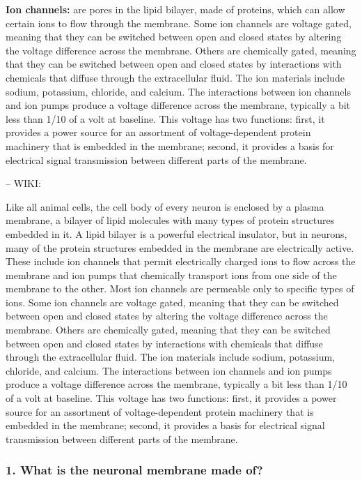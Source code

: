 \textbf{Ion channels:} are pores in the lipid bilayer, made of proteins, which can allow certain ions to flow through the membrane. Some ion channels are voltage gated, meaning that they can be switched between open and closed states by altering the voltage difference across the membrane. Others are chemically gated, meaning that they can be switched between open and closed states by interactions with chemicals that diffuse through the extracellular fluid. The ion materials include sodium, potassium, chloride, and calcium. The interactions between ion channels and ion pumps produce a voltage difference across the membrane, typically a bit less than 1/10 of a volt at baseline. This voltage has two functions: first, it provides a power source for an assortment of voltage-dependent protein machinery that is embedded in the membrane; second, it provides a basis for electrical signal transmission between different parts of the membrane.

--
WIKI:

Like all animal cells, the cell body of every neuron is enclosed by a plasma membrane, a bilayer of lipid molecules with many types of protein structures embedded in it. A lipid bilayer is a powerful electrical insulator, but in neurons, many of the protein structures embedded in the membrane are electrically active. These include ion channels that permit electrically charged ions to flow across the membrane and ion pumps that chemically transport ions from one side of the membrane to the other. Most ion channels are permeable only to specific types of ions. Some ion channels are voltage gated, meaning that they can be switched between open and closed states by altering the voltage difference across the membrane. Others are chemically gated, meaning that they can be switched between open and closed states by interactions with chemicals that diffuse through the extracellular fluid. The ion materials include sodium, potassium, chloride, and calcium. The interactions between ion channels and ion pumps produce a voltage difference across the membrane, typically a bit less than 1/10 of a volt at baseline. This voltage has two functions: first, it provides a power source for an assortment of voltage-dependent protein machinery that is embedded in the membrane; second, it provides a basis for electrical signal transmission between different parts of the membrane.

\subsubsection{1. What is the neuronal membrane made of?}


